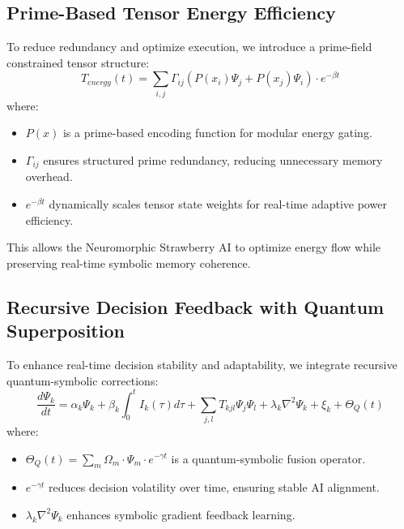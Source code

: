\documentclass{article}
\theoremstyle{plain}
\theoremstyle{plain}
\theoremstyle{definition}
\theoremstyle{remark}
\begin{document}
\subsection{Prime-Based Tensor Energy Efficiency}
To reduce redundancy and optimize execution, we introduce a prime-field constrained tensor structure:
\begin{equation}
    T_{energy}(t) = \sum_{i,j} \Gamma_{ij} (P(x_i) \Psi_j + P(x_j) \Psi_i) \cdot e^{-\beta t}
\end{equation}
where:
\begin{itemize}
    \item \( P(x) \) is a prime-based encoding function for modular energy gating.
    \item \( \Gamma_{ij} \) ensures structured prime redundancy, reducing unnecessary memory overhead.
    \item \( e^{-\beta t} \) dynamically scales tensor state weights for real-time adaptive power efficiency.
\end{itemize}
This allows the Neuromorphic Strawberry AI to optimize energy flow while preserving real-time symbolic memory coherence.

\subsection{Recursive Decision Feedback with Quantum Superposition}
To enhance real-time decision stability and adaptability, we integrate recursive quantum-symbolic corrections:
\begin{equation}
    \frac{d \Psi_k}{dt} = \alpha_k \Psi_k + \beta_k \int_{0}^{t} I_k(\tau) d\tau + \sum_{j,l} T_{kjl} \Psi_j \Psi_l + \lambda_k \nabla^2 \Psi_k + \xi_k + \Theta_{Q}(t)
\end{equation}
where:
\begin{itemize}
    \item \( \Theta_Q(t) = \sum_{m} \Omega_m \cdot \Psi_m \cdot e^{-\gamma t} \) is a quantum-symbolic fusion operator.
    \item \( e^{-\gamma t} \) reduces decision volatility over time, ensuring stable AI alignment.
    \item \( \lambda_k \nabla^2 \Psi_k \) enhances symbolic gradient feedback learning.
\end{itemize}
\end{document}
